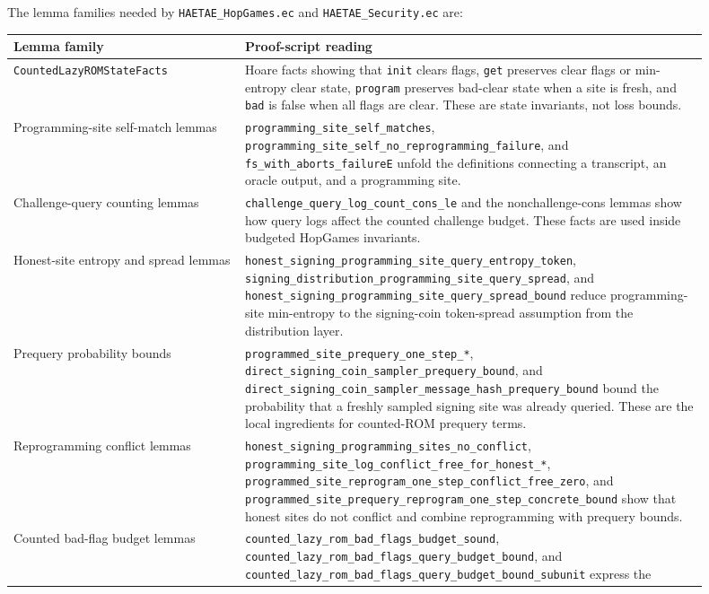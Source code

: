 \documentclass[11pt]{report}
\DeclareRobustCommand{\file}[1]{\ifmmode\text{\nolinkurl{#1}}\else\nolinkurl{#1}\fi}
\DeclareRobustCommand{\ec}[1]{\ifmmode\text{\nolinkurl{#1}}\else\nolinkurl{#1}\fi}
\theoremstyle{definition}
\theoremstyle{plain}
\begin{document}
The lemma families needed by \file{HAETAE\_HopGames.ec} and
\file{HAETAE\_Security.ec} are:

\begin{longtable}{p{0.30\linewidth}p{0.60\linewidth}}
\toprule
\textbf{Lemma family} & \textbf{Proof-script reading} \\
\midrule
\ec{CountedLazyROMStateFacts} &
Hoare facts showing that \ec{init} clears flags, \ec{get} preserves clear
flags or min-entropy clear state, \ec{program} preserves bad-clear state when a
site is fresh, and \ec{bad} is false when all flags are clear.  These are state
invariants, not loss bounds. \\
Programming-site self-match lemmas &
\ec{programming\_site\_self\_matches},
\ec{programming\_site\_self\_no\_reprogramming\_failure}, and
\ec{fs\_with\_aborts\_failureE} unfold the definitions connecting a transcript,
an oracle output, and a programming site. \\
Challenge-query counting lemmas &
\ec{challenge\_query\_log\_count\_cons\_le} and the nonchallenge-cons lemmas
show how query logs affect the counted challenge budget.  These facts are used
inside budgeted HopGames invariants. \\
Honest-site entropy and spread lemmas &
\ec{honest\_signing\_programming\_site\_query\_entropy\_token},
\ec{signing\_distribution\_programming\_site\_query\_spread}, and
\ec{honest\_signing\_programming\_site\_query\_spread\_bound} reduce
programming-site min-entropy to the signing-coin token-spread assumption from
the distribution layer. \\
Prequery probability bounds &
\ec{programmed\_site\_prequery\_one\_step\_*},
\ec{direct\_signing\_coin\_sampler\_prequery\_bound}, and
\ec{direct\_signing\_coin\_sampler\_message\_hash\_prequery\_bound} bound the
probability that a freshly sampled signing site was already queried.  These
are the local ingredients for counted-ROM prequery terms. \\
Reprogramming conflict lemmas &
\ec{honest\_signing\_programming\_sites\_no\_conflict},
\ec{programming\_site\_log\_conflict\_free\_for\_honest\_*},
\ec{programmed\_site\_reprogram\_one\_step\_conflict\_free\_zero}, and
\ec{programmed\_site\_prequery\_reprogram\_one\_step\_concrete\_bound} show
that honest sites do not conflict and combine reprogramming with prequery
bounds. \\
Counted bad-flag budget lemmas &
\ec{counted\_lazy\_rom\_bad\_flags\_budget\_sound},
\ec{counted\_lazy\_rom\_bad\_flags\_query\_budget\_bound}, and
\ec{counted\_lazy\_rom\_bad\_flags\_query\_budget\_bound\_subunit} express the

\end{longtable}
\end{document}
